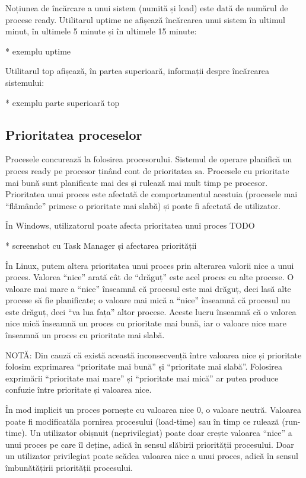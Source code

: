 Noțiunea de încărcare a unui sistem (numită și load) este dată de numărul de
procese ready. Utilitarul uptime ne afișează încărcarea unui sistem în ultimul
minut, în ultimele 5 minute și în ultimele 15 minute:

* exemplu uptime

Utilitarul top afișează, în partea superioară, informații despre încărcarea
sistemului:

* exemplu parte superioară top

\subsection{Prioritatea proceselor}

Procesele concurează la folosirea procesorului. Sistemul de operare planifică un
proces ready pe procesor ținând cont de prioritatea sa. Procesele cu prioritate
mai bună sunt planificate mai des și rulează mai mult timp pe procesor.
Prioritatea unui proces este afectată de comportamentul acestuia (procesele mai
“flămânde” primesc o prioritate mai slabă) și poate fi afectată de utilizator.

În Windows, utilizatorul poate afecta prioritatea unui proces TODO

* screenshot cu Task Manager și afectarea priorității

În Linux, putem altera prioritatea unui proces prin alterarea valorii nice a
unui proces. Valorea “nice” arată cât de “drăguț” este acel proces cu alte
procese. O valoare mai mare a “nice” înseamnă că procesul este mai drăguț, deci
lasă alte procese să fie planificate; o valoare mai mică a “nice” înseamnă că
procesul nu este drăguț, deci “va lua fața” altor procese. Aceste lucru înseamnă
că o valorea nice mică înseamnă un proces cu prioritate mai bună, iar o valoare
nice mare înseamnă un proces cu prioritate mai slabă.

NOTĂ: Din cauză că există această inconsecvență între valoarea nice și
prioritate folosim exprimarea “prioritate mai bună” și “prioritate mai slabă”.
Folosirea exprimării “prioritate mai mare” și “prioritate mai mică” ar putea
produce confuzie între prioritate și valoarea nice.

În mod implicit un proces pornește cu valoarea nice 0, o valoare neutră.
Valoarea poate fi modificatăla pornirea procesului (load-time) sau în timp ce
rulează (run-time). Un utilizator obișnuit (neprivilegiat) poate doar crește
valoarea “nice” a unui proces pe care îl deține, adică în sensul slăbirii
priorității procesului. Doar un utilizator privilegiat poate scădea valoarea
nice a unui proces, adică în sensul îmbunătățirii priorității procesului.

